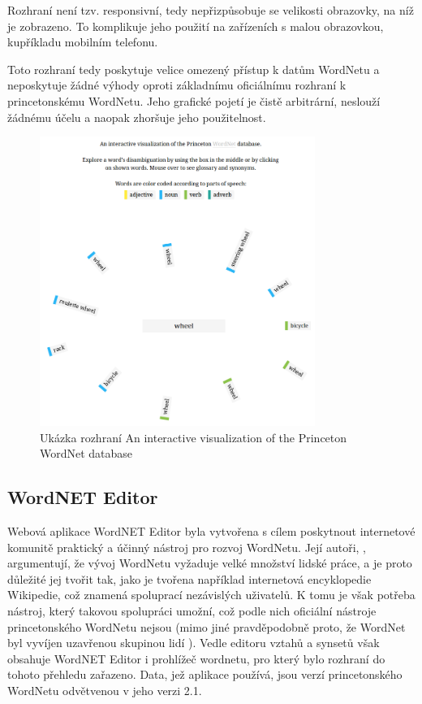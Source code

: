 \documentclass[a4paper, 11pt, oneside]{book}
\begin{document}
					Rozhraní není tzv. responsivní, tedy nepřizpůsobuje se velikosti obrazovky, na níž je zobrazeno. To komplikuje jeho použití na zařízeních s malou obrazovkou, kupříkladu mobilním telefonu.

					Toto rozhraní tedy poskytuje velice omezený přístup k datům WordNetu a neposkytuje žádné výhody oproti základnímu oficiálnímu rozhraní k princetonskému WordNetu. Jeho grafické pojetí je čistě arbitrární, neslouží žádnému účelu a naopak zhoršuje jeho použitelnost.

					\begin{figure}[h]
						\centering
						\includegraphics[width=0.8\textwidth]{intviswn.png}
						\caption{Ukázka rozhraní An interactive visualization of the Princeton WordNet database}
						\label{fig:intviswn}
					\end{figure}

				\subsection{WordNET Editor}
				\label{wnvis:wncoledit}

					Webová aplikace WordNET Editor byla vytvořena s cílem poskytnout internetové komunitě praktický a účinný nástroj pro rozvoj WordNetu. Její autoři, \textcite{szymanski2007cooperative}, argumentují, že vývoj WordNetu vyžaduje velké množství lidské práce, a je proto důležité jej tvořit tak, jako je tvořena například internetová encyklopedie Wikipedie, což znamená spoluprací nezávislých uživatelů. K tomu je však potřeba nástroj, který takovou spolupráci umožní, což podle nich oficiální nástroje princetonského WordNetu nejsou (mimo jiné pravděpodobně proto, že WordNet byl vyvíjen uzavřenou skupinou lidí \parencite{fellbaum2005wordnets}). Vedle editoru vztahů a synsetů však obsahuje WordNET Editor i prohlížeč wordnetu, pro který bylo rozhraní do tohoto přehledu zařazeno. Data, jež aplikace používá, jsou verzí princetonského WordNetu odvětvenou v jeho verzi 2.1. \parencite{szymanski2007cooperative}
\end{document}
